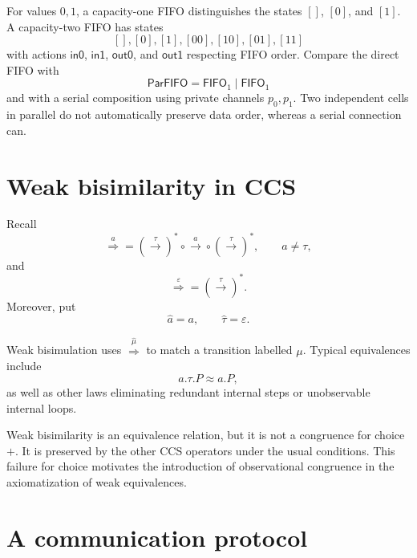 \documentclass[a4paper]{article}
\newcommand{\eps}{\varepsilon}
\newcommand{\trans}[1]{\xrightarrow{#1}}
\newcommand{\wtrans}[1]{\mathrel{\overset{#1}{\Rightarrow}}}
\begin{document}
For values \(0,1\), a capacity-one FIFO distinguishes the states \([]\), \([0]\), and \([1]\).
A capacity-two FIFO has states
\[
    [],[0],[1],[00],[10],[01],[11]
\]
with actions \(\mathsf{in0}\), \(\mathsf{in1}\), \(\mathsf{out0}\), and \(\mathsf{out1}\) respecting FIFO order.
Compare the direct FIFO with
\[
    \mathsf{ParFIFO}=\mathsf{FIFO}_1\mid\mathsf{FIFO}_1
\]
and with a serial composition using private channels \(p_0,p_1\).
Two independent cells in parallel do not automatically preserve data order, whereas a serial connection can.

\section{Weak bisimilarity in CCS}

Recall
\[
    \wtrans{a}
    =
    (\trans{\tau})^*\circ\trans{a}\circ(\trans{\tau})^*,
    \qquad a\neq\tau,
\]
and
\[
    \wtrans{\eps}
    =
    (\trans{\tau})^*.
\]
Moreover, put
\[
    \widehat a=a,
    \qquad
    \widehat\tau=\eps.
\]

Weak bisimulation uses \(\wtrans{\widehat\mu}\) to match a transition labelled \(\mu\).
Typical equivalences include
\[
    a.\tau.P\approx a.P,
\]
as well as other laws eliminating redundant internal steps or unobservable internal loops.

Weak bisimilarity is an equivalence relation, but it is not a congruence for choice \(+\).
It is preserved by the other CCS operators under the usual conditions.
This failure for choice motivates the introduction of observational congruence in the axiomatization of weak equivalences.

\section{A communication protocol}
\end{document}
